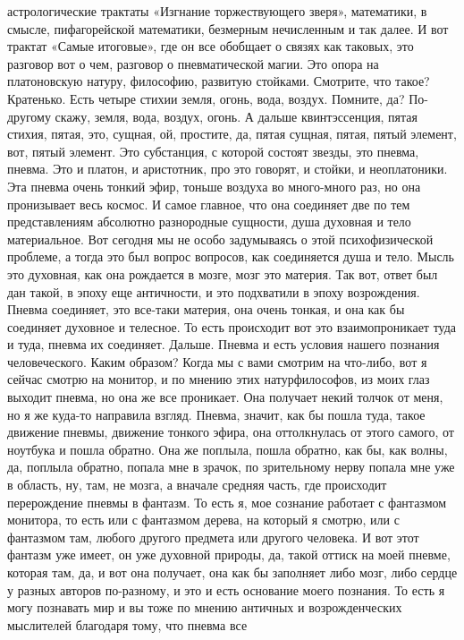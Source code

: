 астрологические трактаты «Изгнание торжествующего зверя», математики, в смысле,
пифагорейской математики, безмерным нечисленным и так далее. И вот трактат
«Самые итоговые», где он все обобщает о связях как таковых, это разговор вот о
чем, разговор о пневматической магии. Это опора на платоновскую натуру,
философию, развитую стойками. Смотрите, что такое? Кратенько. Есть четыре стихии
земля, огонь, вода, воздух. Помните, да? По-другому скажу, земля, вода, воздух,
огонь. А дальше квинтэссенция, пятая стихия, пятая, это, сущная, ой, простите,
да, пятая сущная, пятая, пятый элемент, вот, пятый элемент. Это субстанция, с
которой состоят звезды, это пневма, пневма. Это и платон, и аристотник, про это
говорят, и стойки, и неоплатоники. Эта пневма очень тонкий эфир, тоньше воздуха
во много-много раз, но она пронизывает весь космос. И самое главное, что она
соединяет две по тем представлениям абсолютно разнородные сущности, душа
духовная и тело материальное. Вот сегодня мы не особо задумываясь о этой
психофизической проблеме, а тогда это был вопрос вопросов, как соединяется душа
и тело. Мысль это духовная, как она рождается в мозге, мозг это материя. Так
вот, ответ был дан такой, в эпоху еще античности, и это подхватили в эпоху
возрождения. Пневма соединяет, это все-таки материя, она очень тонкая, и она как
бы соединяет духовное и телесное. То есть происходит вот это взаимопроникает
туда и туда, пневма их соединяет. Дальше. Пневма и есть условия нашего познания
человеческого. Каким образом? Когда мы с вами смотрим на что-либо, вот я сейчас
смотрю на монитор, и по мнению этих натурфилософов, из моих глаз выходит пневма,
но она же все проникает. Она получает некий толчок от меня, но я же куда-то
направила взгляд. Пневма, значит, как бы пошла туда, такое движение пневмы,
движение тонкого эфира, она оттолкнулась от этого самого, от ноутбука и пошла
обратно. Она же поплыла, пошла обратно, как бы, как волны, да, поплыла обратно,
попала мне в зрачок, по зрительному нерву попала мне уже в область, ну, там, не
мозга, а вначале средняя часть, где происходит перерождение пневмы в фантазм. То
есть я, мое сознание работает с фантазмом монитора, то есть или с фантазмом
дерева, на который я смотрю, или с фантазмом там, любого другого предмета или
другого человека. И вот этот фантазм уже имеет, он уже духовной природы, да,
такой оттиск на моей пневме, которая там, да, и вот она получает, она как бы
заполняет либо мозг, либо сердце у разных авторов по-разному, и это и есть
основание моего познания. То есть я могу познавать мир и вы тоже по мнению
античных и возрожденческих мыслителей благодаря тому, что пневма все
